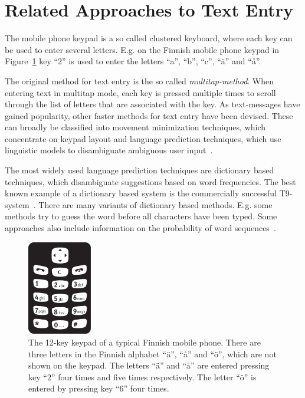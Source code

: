 \documentclass{llncs}
\begin{document}
\section{Related Approaches to Text Entry}\label{earlier-work}

The mobile phone keypad is a so called clustered keyboard, where each
key can be used to enter several letters. E.g. on the Finnish mobile
phone keypad in Figure~\ref{keypad} key ``2'' is used to enter the
letters ``a'', ``b'', ``c'', ``\"{a}'' and ``å''.

The original method for text entry is the so called
\textit{multitap-method}. When entering text in multitap mode, each key is
pressed multiple times to scroll through the list of letters that are
associated with the key. As text-messages have gained popularity, other
faster methods for text entry have been devised. These can broadly be
classified into movement minimization techniques, which concentrate on
keypad layout and language prediction techniques, which use linguistic
models to disambiguate ambiguous user input~\cite{Mackenzie/HCI/2002}.

The most widely used language prediction techniques are dictionary
based techniques, which disambiguate suggestions based on word
frequencies. The best known example of a dictionary based system is
the commercially successful T9-system~\cite{t9-patent}. There are many
variants of dictionary based methods. E.g. some methods try to guess
the word before all characters have been typed. Some approaches also
include information on the probability of word
sequences~\cite{Mackenzie/HCI/2002}.

\begin{figure}[hbt!]
\begin{center}
\includegraphics[width=1.1in]{Nappaimet.pdf}
\caption{The 12-key keypad of a typical Finnish mobile phone. There
  are three letters in the Finnish alphabet ``\"{a}'', ``å'' and ``\"{o}'',
  which are not shown on the keypad. The letters ``\"{a}'' and ``å'' are
  entered pressing key ``2'' four times and five times respectively. The
  letter ``\"{o}'' is entered by pressing key ``6'' four
  times.}\label{keypad}
\end{center}
\end{figure}
\end{document}
